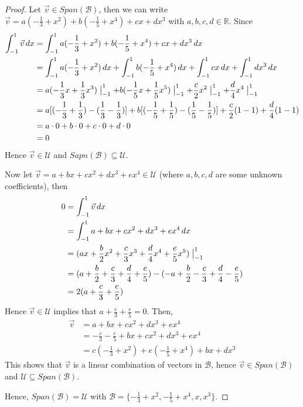 \documentclass{article}
\begin{document}
\begin{proof}
Let $\vec{v} \in Span(\mathcal{B})$, then we can write $\vec{v} = a(-\frac{1}{3}+x^2)+b(-\frac{1}{5}+x^4 )+cx+dx^3$ with $a,b,c,d \in \mathbb{R}$. Since 
\begin{align*}
\int_{-1}^1 \vec{v} \, dx &= \int_{-1}^1 a(-\frac{1}{3}+x^2)+b(-\frac{1}{5}+x^4 )+cx+dx^3 \, dx \\
&= \int_{-1}^1 a(-\frac{1}{3}+x^2) \, dx + \int_{-1}^1 b(-\frac{1}{5}+x^4 ) \, dx + \int_{-1}^1 cx \, dx+ \int_{-1}^1 dx^3 \, dx \\
&= a(-\frac{1}{3}x+\frac{1}{3}x^3) \bigm|_{-1}^1 +b(-\frac{1}{5}x+\frac{1}{5}x^5) \bigm|_{-1}^1+ \frac{c}{2}x^2 \bigm|_{-1}^1 + \frac{d}{4}x^4 \bigm|_{-1}^1 \\
&= a[(-\frac{1}{3}+\frac{1}{3}) -(\frac{1}{3}-\frac{1}{3})] + b[(-\frac{1}{5}+\frac{1}{5}) -(\frac{1}{5}-\frac{1}{5})] + \frac{c}{2}(1-1)+ \frac{d}{4}(1-1) \\
&= a \cdot 0 + b\cdot 0 + c \cdot 0 +d \cdot 0 \\
&= 0
\end{align*}
Hence $\vec{v} \in \mathcal{U}$ and $Sapn(\mathcal{B}) \subseteq \mathcal{U}$.

Now let $\vec{v} = a + bx+cx^2+dx^3+ex^4 \in \mathcal{U}$ (where $a,b,c,d$ are some unknown coefficients), then
\begin{align*}
0 &= \int_{-1}^1 \vec{v} \, dx \\
&= \int_{-1}^1 a+bx+cx^2+dx^3+ex^4 \, dx \\
&= (ax + \frac{b}{2}x^2 + \frac{c}{3}x^3 + \frac{d}{4}x^4 + \frac{e}{5}x^5) \bigm|_{-1}^1 \\
&= (a+ \frac{b}{2} + \frac{c}{3} +\frac{d}{4} +\frac{e}{5}) - (-a+ \frac{b}{2} - \frac{c}{3} +\frac{d}{4} -\frac{e}{5}) \\
&= 2(a + \frac{c}{3} +\frac{e}{5})
\end{align*}
Hence $\vec{v} \in \mathcal{U}$ implies that $a+\frac{c}{3} +\frac{e}{5} =0$. Then,
\begin{align*}
\vec{v} &= a + bx+cx^2+dx^3+ex^4 \\
&= -\frac{c}{3} -\frac{e}{5} + bx+cx^2+dx^3+ex^4 \\
&= c(-\frac{1}{3}+x^2) + e(-\frac{1}{5} +x^4) +bx+dx^3
\end{align*}
This shows that $\vec{v}$ is a linear combination of vectors in $\mathcal{B}$, hence $\vec{v} \in Span(\mathcal{B})$ and $\mathcal{U} \subseteq Span(\mathcal{B})$.

Hence, $Span(\mathcal{B}) = \mathcal{U}$ with $\mathcal{B} = \{ -\frac{1}{3}+x^2, -\frac{1}{5}+x^4 , x, x^3 \}$.


\end{proof}
\end{document}
